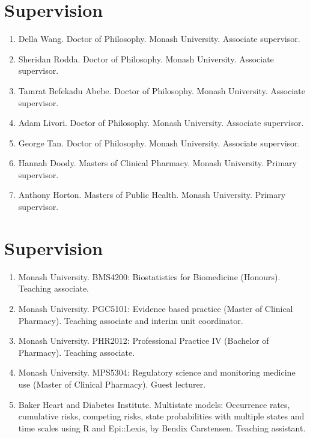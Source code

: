 \documentclass[11pt]{article}
\begin{document}
\section*{Supervision}
\begin{enumerate}
\item Della Wang. Doctor of Philosophy. Monash University. Associate supervisor. 
\item Sheridan Rodda. Doctor of Philosophy. Monash University. Associate supervisor. 
\item Tamrat Befekadu Abebe. Doctor of Philosophy. Monash University. Associate supervisor. 
\item Adam Livori. Doctor of Philosophy. Monash University. Associate supervisor. 
\item George Tan. Doctor of Philosophy. Monash University. Associate supervisor. 
\item Hannah Doody. Masters of Clinical Pharmacy. Monash University. Primary supervisor. 
\item Anthony Horton. Masters of Public Health. Monash University. Primary supervisor.
\end{enumerate}

\section*{Supervision}
\begin{enumerate}
\item Monash University. BMS4200: Biostatistics for Biomedicine (Honours). Teaching associate.
\item Monash University. PGC5101: Evidence based practice (Master of Clinical Pharmacy). Teaching associate and interim unit coordinator.
\item Monash University. PHR2012: Professional Practice IV (Bachelor of Pharmacy). Teaching associate.
\item Monash University. MPS5304: Regulatory science and monitoring medicine use (Master of Clinical Pharmacy). Guest lecturer.
\item Baker Heart and Diabetes Institute. Multistate models: Occurrence rates, cumulative risks, 
competing risks, state probabilities with multiple states and time scales using R and Epi::Lexis, by Bendix Carstensen. Teaching assistant.
\end{enumerate}

\end{document}
